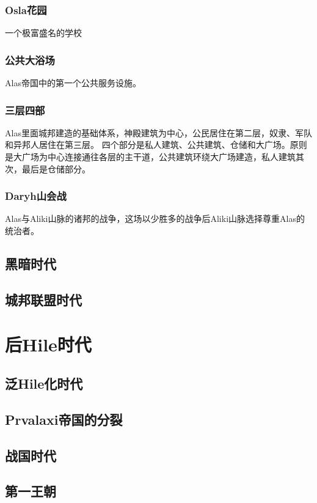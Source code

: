 \documentclass[UTF8,12pt]{ctexbook}
\begin{document}
        \section{Osla花园}
            一个极富盛名的学校
        \section{公共大浴场}
            Alas帝国中的第一个公共服务设施。
        \section{三层四部}
            Alas里面城邦建造的基础体系，神殿建筑为中心，公民居住在第二层，奴隶、军队和异邦人居住在第三层。
            四个部分是私人建筑、公共建筑、仓储和大广场。原则是大广场为中心连接通往各层的主干道，公共建筑环绕大广场建造，私人建筑其次，最后是仓储部分。
        \section{Daryh山会战}
            Alas与Aliki山脉的诸邦的战争，这场以少胜多的战争后Aliki山脉选择尊重Alas的统治者。
    \chapter{黑暗时代}

    \chapter{城邦联盟时代}




\part{后Hile时代}
    \chapter{泛Hile化时代}

    \chapter{Prvalaxi帝国的分裂}

    \chapter{战国时代}

    \chapter{第一王朝}
\end{document}
